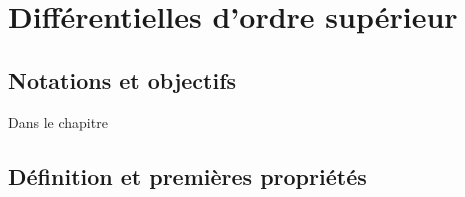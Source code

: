\chapter{Différentielles d'ordre supérieur}

\section*{Notations et objectifs}

Dans le chapitre
\section{Définition et premières propriétés}

